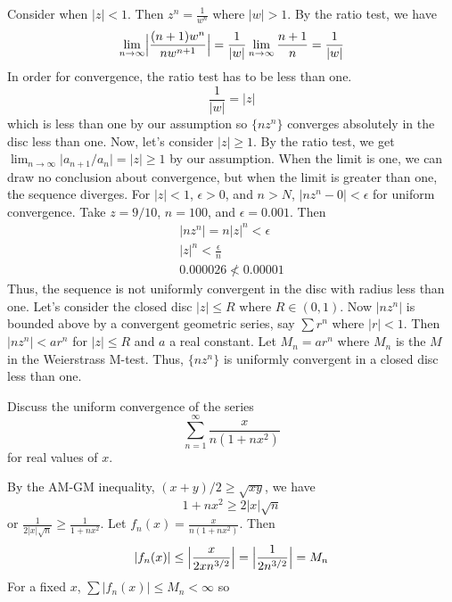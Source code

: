 \begin{exercise}
  \par\smallskip
  Consider when \(\lvert z\rvert < 1\).
  Then \(z^n = \frac{1}{w^n}\) where \(\lvert w\rvert > 1\).
  By the ratio test, we have
  \[
  \lim_{n\to\infty}\Bigl\lvert\frac{(n + 1)w^n}{nw^{n + 1}}\Bigr\rvert =
  \frac{1}{\lvert w\rvert}\lim_{n\to\infty}\frac{n + 1}{n} =
  \frac{1}{\lvert w\rvert}
  \]
  In order for convergence, the ratio test has to be less than one.
  \[
  \frac{1}{\lvert w\rvert} = \lvert z\rvert
  \]
  which is less than one by our assumption so \(\{nz^n\}\) converges
  absolutely in the disc less than one.
  Now, let's consider \(\lvert z\rvert\geq 1\).
  By the ratio test, we get
  \(\lim_{n\to\infty}\lvert a_{n + 1}/a_n\rvert = \lvert z\rvert\geq 1\) by our
  assumption.
  When the limit is one, we can draw no conclusion about convergence, but when
  the limit is greater than one, the sequence diverges.
  For \(\lvert z\rvert < 1\), \(\epsilon > 0\), and \(n > N\),
  \(\lvert nz^n - 0\rvert < \epsilon\) for uniform convergence.
  Take \(z = 9/10\), \(n = 100\), and \(\epsilon = 0.001\).
  Then
  \begin{gather*}
    \lvert nz^n\rvert = n\lvert z\rvert^n < \epsilon\\
    \lvert z\rvert^n < \frac{\epsilon}{n}\\
    0.000026 \not < 0.00001
  \end{gather*}
  Thus, the sequence is not uniformly convergent in the disc with radius less
  than one.
  Let's consider the closed disc \(\lvert z\rvert\leq R\) where \(R\in(0,1)\).
  Now \(\lvert nz^n\rvert\) is bounded above by a convergent geometric series,
  say \(\sum r^n\) where \(\lvert r\rvert < 1\).
  Then \(\lvert nz^n\rvert < ar^n\) for \(\lvert z\rvert\leq R\) and \(a\) a
  real constant.
  Let \(M_n = ar^n\) where \(M_n\) is the \(M\) in the Weierstrass M-test.
  Thus, \(\{nz^n\}\) is uniformly convergent in a closed disc less than one.
\item
  Discuss the uniform convergence of the series
  \[
  \sum_{n = 1}^{\infty}\frac{x}{n(1 + nx^2)}
  \]
  for real values of \(x\).
  \par\smallskip
  By the AM-GM inequality, \((x + y)/2\geq \sqrt{xy}\), we have
  \[
  1 + nx^2\geq 2\lvert x\rvert\sqrt{n}
  \]
  or \(\frac{1}{2\lvert x\rvert\sqrt{n}}\geq\frac{1}{1 + nx^2}\).
  Let \(f_n(x) = \frac{x}{n(1 + nx^2)}\).
  Then
  \[
  \lvert f_n(x)\rvert\leq \Bigl\lvert\frac{x}{2xn^{3/2}}\Bigr\rvert =
  \Bigl\lvert\frac{1}{2n^{3/2}}\Bigr\rvert = M_n
  \]
  For a fixed \(x\), \(\sum\lvert f_n(x)\rvert\leq M_n < \infty\) so

\end{exercise}
